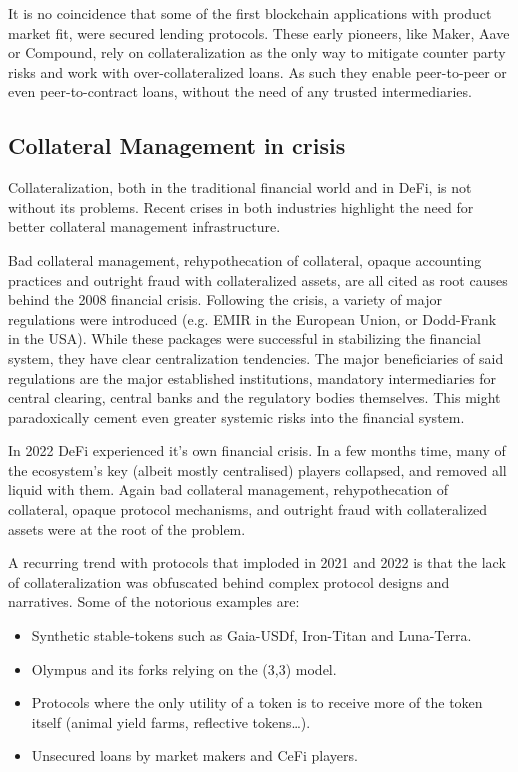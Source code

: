 \documentclass[sigconf,nonacm]{acmart}
\begin{document}
It is no coincidence that some of the first blockchain applications with product market fit, were secured lending protocols.
These early pioneers, like Maker\cite{team2017dai}, Aave\cite{thornburg2020aave} or Compound\cite{leshner2019compound},
rely on collateralization as the only way to mitigate counter party risks and work with over-collateralized loans.
As such they enable peer-to-peer or even peer-to-contract loans, without the need of any trusted intermediaries.

\subsection{Collateral Management in crisis}
Collateralization, both in the traditional financial world and in DeFi, is not without its problems.
Recent crises in both industries highlight the need for better collateral management infrastructure.

Bad collateral management, rehypothecation of collateral, opaque accounting practices
and outright fraud with collateralized assets, are all cited as root causes\cite{hellwig2008causes} behind the 2008 financial crisis.
Following the crisis, a variety of major regulations were introduced (e.g. EMIR in the European Union, or Dodd-Frank in the USA).
While these packages were successful in stabilizing the financial system, they have clear centralization tendencies\cite{gregory2014central}.
The major beneficiaries of said regulations are the major established institutions, mandatory intermediaries for central clearing,
central banks and the regulatory bodies themselves.
This might paradoxically cement even greater systemic risks into the financial system.

In 2022 DeFi experienced it's own financial crisis.
In a few months time, many of the ecosystem's key (albeit mostly centralised) players collapsed, and removed all liquid with them.
Again bad collateral management, rehypothecation of collateral, opaque protocol mechanisms,
and outright fraud with collateralized assets were at the root of the problem.

A recurring trend with protocols that imploded in 2021 and 2022 is that the lack of collateralization was obfuscated behind complex protocol designs and narratives. 
Some of the notorious examples are:
\begin{itemize}
    \item Synthetic stable-tokens such as Gaia-USDf, Iron-Titan and Luna-Terra.
    \item Olympus and its forks relying on the (3,3) model.
    \item Protocols where the only utility of a token is to receive more of the token itself (animal yield farms, reflective tokens…).
    \item Unsecured loans by market makers and CeFi players.
\end{itemize}
\end{document}
